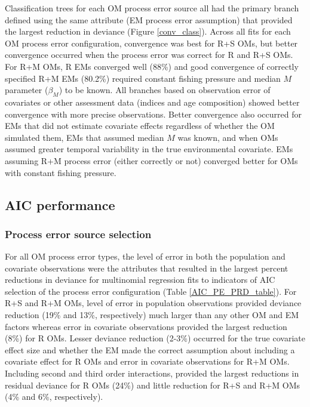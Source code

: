 \documentclass[
  12pt,
]{article}
\begin{document}
Classification trees for each OM process error source all had the primary branch defined using the same attribute (EM process error assumption) that provided the largest reduction in deviance (Figure \ref{conv_class}). Across all fits for each OM process error configuration, convergence was best for R+S OMs, but better convergence occurred when the process error was correct for R and R+S OMs. For R+M OMs, R EMs converged well (88\%) and good convergence of correctly specified R+M EMs (80.2\%) required constant fishing pressure and median \(M\) parameter (\(\beta_M\)) to be known. All branches based on observation error of covariates or other assessment data (indices and age composition) showed better convergence with more precise observations. Better convergence also occurred for EMs that did not estimate covariate effects regardless of whether the OM simulated them, EMs that assumed median \(M\) was known, and when OMs assumed greater temporal variability in the true environmental covariate. EMs assuming R+M process error (either correctly or not) converged better for OMs with constant fishing pressure.

\subsection*{AIC performance}\label{aic-performance}

\subsubsection*{Process error source selection}\label{process-error-source-selection}

For all OM process error types, the level of error in both the population and covariate observations were the attributes that resulted in the largest percent reductions in deviance for multinomial regression fits to indicators of AIC selection of the process error configuration (Table \ref{AIC_PE_PRD_table}). For R+S and R+M OMs, level of error in population observations provided deviance reduction (19\% and 13\%, respectively) much larger than any other OM and EM factors whereas error in covariate observations provided the largest reduction (8\%) for R OMs. Lesser deviance reduction (2-3\%) occurred for the true covariate effect size and whether the EM made the correct assumption about including a covariate effect for R OMs and error in covariate observations for R+M OMs. Including second and third order interactions, provided the largest reductions in residual deviance for R OMs (24\%) and little reduction for R+S and R+M OMs (4\% and 6\%, respectively).
\end{document}
